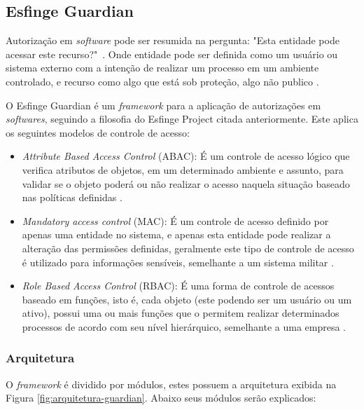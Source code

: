 \subsection{Esfinge Guardian}

\par Autorização em \textit{software} pode ser resumida na pergunta: "Esta entidade pode acessar este recurso?"\ \cite{sandhu1994access}. Onde entidade pode ser definida como um usuário ou sistema externo com a intenção de realizar um processo em um ambiente controlado, e recurso como algo que está sob proteção, algo não publico \cite{bartsch2011authorization}.
\par O Esfinge Guardian é um \textit{framework} para a aplicação de autorizações em \textit{softwares}, seguindo a filosofia do Esfinge Project citada anteriormente. Este aplica os seguintes modelos de controle de acesso:

\begin{itemize}
    \item \textit{Attribute Based Access Control} (ABAC): É um controle de acesso lógico que verifica atributos de objetos, em um determinado ambiente e assunto, para validar se o objeto poderá ou não realizar o acesso naquela situação baseado nas políticas definidas \cite{hu2015attribute}.
    
    \item \textit{Mandatory access control} (MAC): É um controle de acesso definido por apenas uma entidade no sistema, e apenas esta entidade pode realizar a alteração das permissões definidas, geralmente este tipo de controle de acesso é utilizado para informações sensíveis, semelhante a um sistema militar \cite{lindqvist2006mandatory}.
    \item \textit{Role Based Access Control} (RBAC): É uma forma de controle de acessos baseado em funções, isto é, cada objeto (este podendo ser um usuário ou um ativo), possui uma ou mais funções que o permitem realizar determinados processos de acordo com seu nível hierárquico, semelhante a uma empresa \cite{sandhu2000nist}.
\end{itemize}

\subsubsection{Arquitetura}

\par O \textit{framework} é dividido por módulos, estes possuem a arquitetura exibida na Figura \ref{fig:arquitetura-guardian}. Abaixo seus módulos serão explicados:

